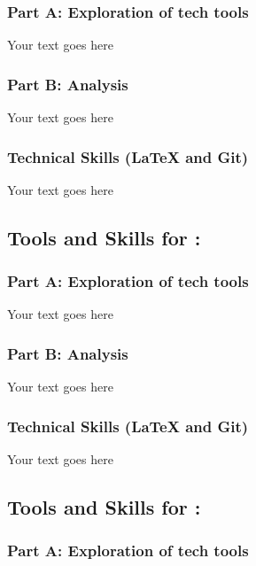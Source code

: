 \documentclass[a4paper, 11pt]{report}
\begin{document}
{{\subsubsection{Part A: Exploration of tech tools}

Your text goes here

\subsubsection{Part B: Analysis}

Your text goes here

\subsubsection{Technical Skills (LaTeX and Git)}

Your text goes here



\subsection{Tools and Skills for \majB: \studB}

\subsubsection{Part A: Exploration of tech tools}

Your text goes here

\subsubsection{Part B: Analysis}

Your text goes here

\subsubsection{Technical Skills (LaTeX and Git)}

Your text goes here


\subsection{Tools and Skills for \majC: \studC}

\subsubsection{Part A: Exploration of tech tools}

}}
\end{document}
